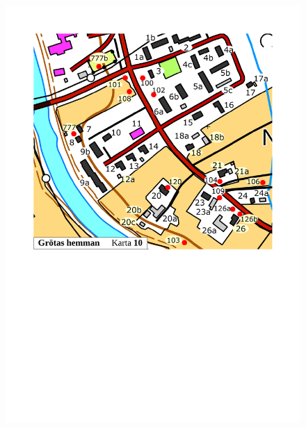 \begin{figure}[htbp]
  \centering
  \includegraphics[width=1\textwidth]{kartor/Karta10.pdf}
  \label{map:10}
\end{figure}

